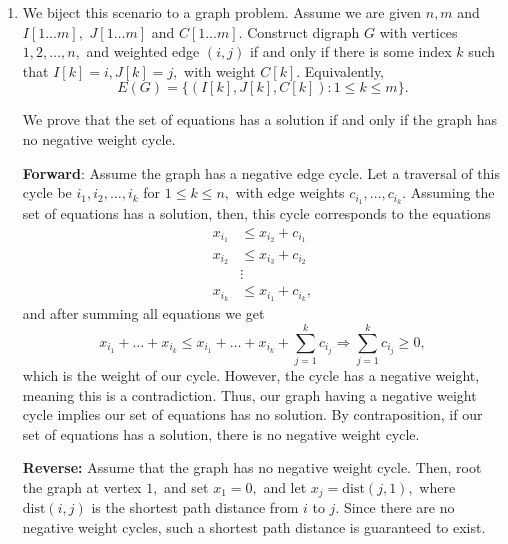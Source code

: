 \documentclass[12pt]{article}
\begin{document}
\begin{enumerate}
\begin{algorithm}
\begin{algorithmic}
        \vspace{3mm}

        \State \Return \texttt{dist}, \texttt{le}
        \EndProcedure
      \end{algorithmic}
    \end{algorithm}

    \newpage

  \item We biject this scenario to a graph problem. Assume we are
    given $n, m$ and $I[1\ldots m],$ $J[1 \ldots m]$ and $C[1 \ldots
    m].$ Construct digraph $G$ with vertices $1, 2, \ldots, n,$ and
    weighted edge $(i, j)$ if and only if there is some index $k$
    such that $I[k] = i, J[k] = j,$ with weight $C[k].$ Equivalently,
    $$
    E(G) = \{(I[k], J[k], C[k]) : 1 \leq k \leq m\}.
    $$

    We prove that the set of equations has a solution if and only if
    the graph has no negative weight cycle.

    \textbf{Forward}: Assume the graph has a negative edge cycle. Let
    a traversal of this cycle be $i_1, i_2, \ldots, i_k$ for $1 \leq
    k \leq n,$ with edge weights $c_{i_1}, \ldots, c_{i_k}.$ Assuming
    the set of equations has a solution, then, this cycle corresponds
    to the equations
    \begin{align*}
      x_{i_1} &\leq  x_{i_2} + c_{i_1} \\
      x_{i_2} &\leq  x_{i_3} + c_{i_2} \\
      &\vdots \\
      x_{i_k} &\leq  x_{i_1} + c_{i_k},
    \end{align*}
    and after summing all equations we get
    $$
    x_{i_1} + \ldots + x_{i_k} \leq x_{i_1} + \ldots + x_{i_k } +
    \sum_{j = 1}^{k} c_{i_j} \Rightarrow \sum_{j = 1}^{k}c_{i_j} \geq 0,
    $$
    which is the weight of our cycle. However, the cycle has a
    negative weight, meaning this is a contradiction. Thus, our graph
    having a negative weight cycle implies our set of equations has
    no solution. By contraposition, if our set of equations has a
    solution, there is no negative weight cycle.

    \textbf{Reverse:} Assume that the graph has no negative weight
    cycle. Then, root the graph at vertex $1,$ and set $x_1 = 0,$ and
    let $x_j = \text{dist}(j, 1),$ where $\text{dist}(i , j)$ is the
    shortest path distance from $i$ to $j.$ Since there are no
    negative weight cycles, such a shortest path distance is
    guaranteed to exist.


\end{enumerate}
\end{document}

